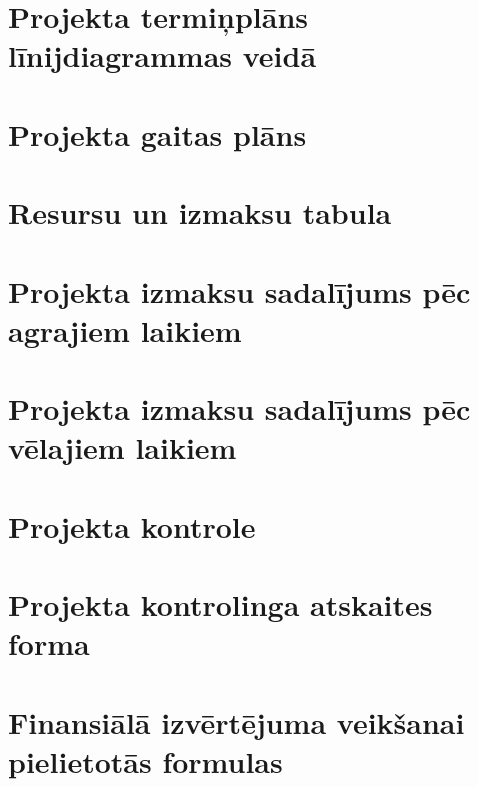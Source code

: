 \section{Projekta termiņplāns līnijdiagrammas veidā}
	\label{app:Projekta_linijdiagrammas}
    \clearpage
\section{Projekta gaitas plāns}
	\label{app:Projekta_gaitas_plans}
    \clearpage
\section{Resursu un izmaksu tabula}
	\label{app:Projekta_resursu_izmaksu_tabula}
    \clearpage
\section{Projekta izmaksu sadalījums pēc agrajiem laikiem}
	\label{app:Projekta_izmaksu_salidzinajums_agrais}
    \clearpage
\section{Projekta izmaksu sadalījums pēc vēlajiem laikiem}
	\label{app:Projekta_izmaksu_salidzinajums_velais}
    \clearpage
\section{Projekta kontrole}
	\label{app:Projekta_konrole}
    \clearpage
\section{Projekta kontrolinga atskaites forma}
	\label{app:Projekta_atskaitas_forma}
    \clearpage
\section{Finansiālā izvērtējuma veikšanai pielietotās formulas }
	\label{app:Projekta_formulas}
    \clearpage
